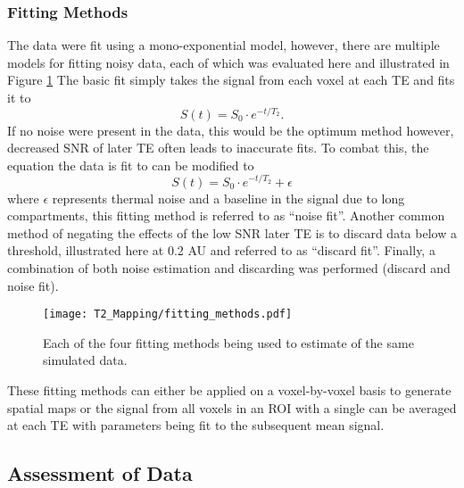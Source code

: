 \subsubsection{\ttwo Fitting Methods}

The data were fit using a mono-exponential model, however, there are multiple models for fitting noisy data, each of which was evaluated here and illustrated in Figure \ref{fig:t2_fitting_methods} The basic fit simply takes the signal from each voxel at each \ac{TE} and fits it to 
\begin{equation}
	S(t) = S_0 \cdot e^{-t/T_2}.
	\label{eq:t2}
\end{equation}
If no noise were present in the data, this would be the optimum method however, decreased SNR of later \ac{TE} often leads to inaccurate fits. To combat this, the equation the data is fit to can be modified to
\begin{equation}
	S(t) = S_0 \cdot e^{-t/T_2} + \epsilon
	\label{eq:t2_noise}
\end{equation}
where $\epsilon$ represents thermal noise and a baseline in the signal due to long \ttwo compartments, this fitting method is referred to as ``noise fit''. Another common method of negating the effects of the low \ac{SNR} later \ac{TE} is to discard data below a threshold, illustrated here at 0.2 AU and referred to as ``discard fit''. Finally, a combination of both noise estimation and discarding was performed (discard and noise fit).

\begin{figure}[H]
	\centering
	\texttt{[image: T2\_Mapping/fitting\_methods.pdf]}
	\caption{Each of the four fitting methods being used to estimate \ttwo of the same simulated data.}
	\label{fig:t2_fitting_methods}	
\end{figure}

These fitting methods can either be applied on a voxel-by-voxel basis to generate spatial maps or the signal from all voxels in an \ac{ROI} with a single \ttwo can be averaged at each \ac{TE} with parameters being fit to the subsequent mean signal. 

\subsection{Assessment of Data}

